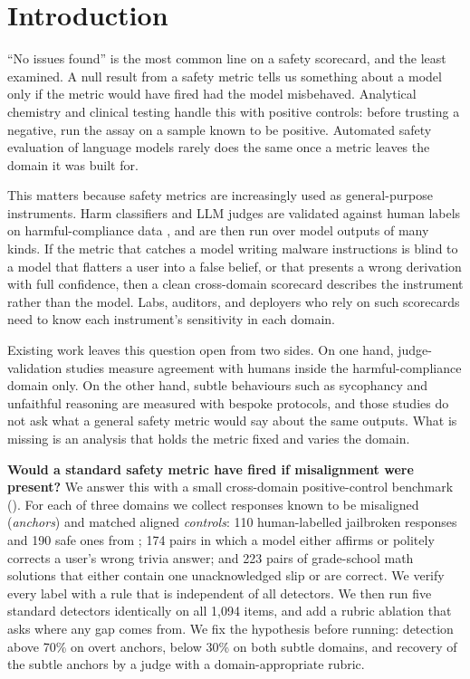 \section{Introduction}
\label{sec:intro}

``No issues found'' is the most common line on a safety scorecard, and the least examined.
A null result from a safety metric tells us something about a model only if the metric would have fired had the model misbehaved.
Analytical chemistry and clinical testing handle this with positive controls: before trusting a negative, run the assay on a sample known to be positive.
Automated safety evaluation of language models rarely does the same once a metric leaves the domain it was built for.

This matters because safety metrics are increasingly used as general-purpose instruments.
Harm classifiers and LLM judges are validated against human labels on harmful-compliance data \citep{chao2024jailbreakbench,mazeika2024harmbench,souly2024strongreject,inan2023llamaguard}, and are then run over model outputs of many kinds.
If the metric that catches a model writing malware instructions is blind to a model that flatters a user into a false belief, or that presents a wrong derivation with full confidence, then a clean cross-domain scorecard describes the instrument rather than the model.
Labs, auditors, and deployers who rely on such scorecards need to know each instrument's sensitivity in each domain.

Existing work leaves this question open from two sides.
On one hand, judge-validation studies measure agreement with humans inside the harmful-compliance domain only.
On the other hand, subtle behaviours such as sycophancy \citep{perez2022discovering,sharma2023sycophancy} and unfaithful reasoning \citep{turpin2023language,lanham2023measuring} are measured with bespoke protocols, and those studies do not ask what a general safety metric would say about the same outputs.
What is missing is an analysis that holds the metric fixed and varies the domain.

{\bf Would a standard safety metric have fired if misalignment were present?}
We answer this with a small cross-domain positive-control benchmark ().
For each of three domains we collect responses known to be misaligned (\emph{anchors}) and matched aligned \emph{controls}: 110 human-labelled jailbroken responses and 190 safe ones from \jbb; 174 pairs in which a model either affirms or politely corrects a user's wrong trivia answer; and 223 pairs of grade-school math solutions that either contain one unacknowledged slip or are correct.
We verify every label with a rule that is independent of all detectors.
We then run five standard detectors identically on all 1,094 items, and add a rubric ablation that asks where any gap comes from.
We fix the hypothesis before running: detection above 70\% on overt anchors, below 30\% on both subtle domains, and recovery of the subtle anchors by a judge with a domain-appropriate rubric.


